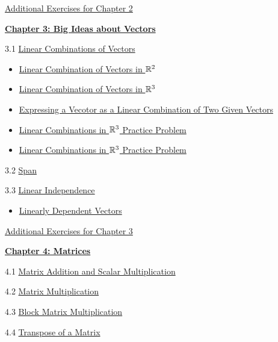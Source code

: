 \documentclass{ximera}
\begin{document}
\href{https://ximera.osu.edu/oerlinalg/LinearAlgebra/SUPX-0020/main}{Additional Exercises for Chapter 2}
	
\href{https://ximera.osu.edu/oerlinalg/LinearAlgebra/XLAChapter_bigIdeas/main}{\textbf{Chapter 3: Big Ideas about Vectors}}
	
3.1	\href{https://ximera.osu.edu/oerlinalg/LinearAlgebra/VEC-0040/main}{Linear Combinations of Vectors}
\begin{itemize}
    \item 
    \href{https://www.geogebra.org/m/md3srgdg}{Linear Combination of Vectors in $\mathbb{R}^2$}
    \item
    \href{https://www.geogebra.org/m/zvzxujp2}{Linear Combination of Vectors in $\mathbb{R}^3$}
    \item
    \href{https://www.geogebra.org/m/u77b52k8}{Expressing a Vecotor as a Linear Combination of Two Given Vectors}
    \item
    \href{https://www.geogebra.org/m/kk5hwjka}{Linear Combinations in $\mathbb{R}^3$ Practice Problem}
    \item
    \href{https://www.geogebra.org/m/x9f6qnyr}{Linear Combinations in $\mathbb{R}^3$ Practice Problem}
\end{itemize}
	
3.2	\href{https://ximera.osu.edu/oerlinalg/LinearAlgebra/VEC-0090/main}{Span}
	
3.3	\href{https://ximera.osu.edu/oerlinalg/LinearAlgebra/VEC-0100/main}{Linear Independence}
\begin{itemize}
    \item 
    \href{https://www.geogebra.org/m/x72vbsaw}{Linearly Dependent Vectors}
\end{itemize}
	
\href{https://ximera.osu.edu/oerlinalg/LinearAlgebra/SUPX-0030/main}{Additional Exercises for Chapter 3}
	
\href{https://ximera.osu.edu/oerlinalg/LinearAlgebra/XLAChapter_matrices/main}{\textbf{Chapter 4: Matrices}}
	
4.1	\href{https://ximera.osu.edu/oerlinalg/LinearAlgebra/MAT-0010/main}{Matrix Addition and Scalar Multiplication}
	
4.2	\href{https://ximera.osu.edu/oerlinalg/LinearAlgebra/MAT-0020/main}{Matrix Multiplication}
	
4.3	\href{https://ximera.osu.edu/oerlinalg/LinearAlgebra/MAT-0023/main}{Block Matrix Multiplication}
	
4.4	\href{https://ximera.osu.edu/oerlinalg/LinearAlgebra/MAT-0025/main}{Transpose of a Matrix}
	
\end{document}
